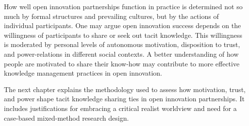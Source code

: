 How well open innovation partnerships function in practice is determined not so much by formal structures and prevailing cultures, but by the actions of individual participants. One may argue open innovation success depends on the willingness of participants to share or seek out tacit knowledge. This willingness is moderated by personal levels of autonomous motivation, disposition to trust, and power-relations in different social contexts. A better understanding of how people are motivated to share their know-how may contribute to more effective knowledge management practices in open innovation.\medskip

The next chapter explains the methodology used to assess how motivation, trust, and power shape tacit knowledge sharing ties in open innovation partnerships. It includes justifications for embracing a critical realist worldview and need for a case-based mixed-method research design.